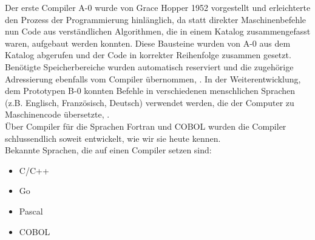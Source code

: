 Der erste Compiler A-0 wurde von Grace Hopper 1952 vorgestellt und erleichterte den Prozess der Programmierung hinlänglich, da statt direkter Maschinenbefehle nun Code aus verständlichen Algorithmen, die in einem Katalog zusammengefasst waren, aufgebaut werden konnten. Diese Bausteine wurden von A-0 aus dem Katalog abgerufen und der Code in korrekter Reihenfolge zusammen gesetzt. Benötigte Speicherbereiche wurden automatisch reserviert und die zugehörige Adressierung ebenfalls vom Compiler übernommen, \cite[vgl. Beyer 2012, S.222ff]{Beyer2012}. In der Weiterentwicklung, dem Prototypen B-0 konnten Befehle in verschiedenen menschlichen Sprachen (z.B. Englisch, Französisch, Deutsch) verwendet werden, die der Computer zu Maschinencode übersetzte, \cite[vg. Beyer 2012, S.271ff]{Beyer2012}.\\
Über Compiler für die Sprachen Fortran und COBOL wurden die Compiler schlussendlich soweit entwickelt, wie wir sie heute kennen. \\
Bekannte Sprachen, die auf einen Compiler setzen sind: 
\begin{itemize}
    \item C/C++
    \item Go
    \item Pascal
    \item COBOL
\end{itemize}

